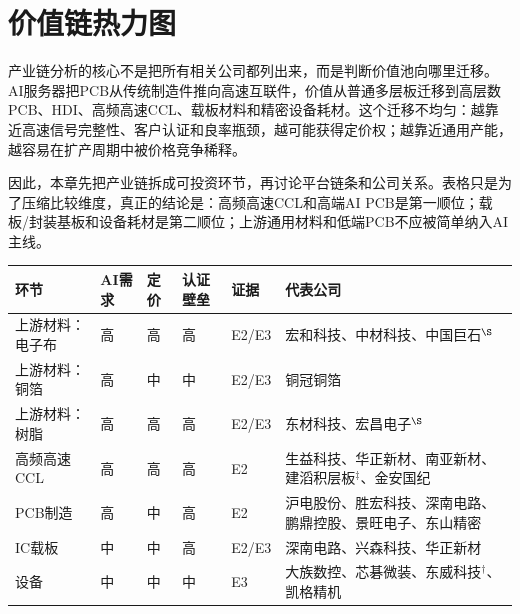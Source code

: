 \section{价值链热力图}

产业链分析的核心不是把所有相关公司都列出来，而是判断价值池向哪里迁移。AI服务器把PCB从传统制造件推向高速互联件，价值从普通多层板迁移到高层数PCB、HDI、高频高速CCL、载板材料和精密设备耗材。这个迁移不均匀：越靠近高速信号完整性、客户认证和良率瓶颈，越可能获得定价权；越靠近通用产能，越容易在扩产周期中被价格竞争稀释。

因此，本章先把产业链拆成可投资环节，再讨论平台链条和公司关系。表格只是为了压缩比较维度，真正的结论是：高频高速CCL和高端AI PCB是第一顺位；载板/封装基板和设备耗材是第二顺位；上游通用材料和低端PCB不应被简单纳入AI主线。

\begin{exhibitbox}[图表4-1：按瓶颈和可投资性划分的环节热力图]
\small
\begin{tabularx}{\textwidth}{L{2.4cm}C{1.8cm}C{1.8cm}C{1.8cm}C{1.8cm}X}
\toprule
\textbf{环节} & \textbf{AI需求} & \textbf{定价} & \textbf{认证壁垒} & \textbf{证据} & \textbf{代表公司} \\
\midrule
上游材料：电子布 & 高 & 高 & 高 & E2/E3 & 宏和科技、中材科技、中国巨石$^\S$ \\
上游材料：铜箔 & 高 & 中 & 中 & E2/E3 & 铜冠铜箔 \\
上游材料：树脂 & 高 & 高 & 高 & E2/E3 & 东材科技、宏昌电子$^\S$ \\
高频高速CCL & 高 & 高 & 高 & E2 & 生益科技、华正新材、南亚新材、建滔积层板$^\ddagger$、金安国纪 \\
PCB制造 & 高 & 中 & 高 & E2 & 沪电股份、胜宏科技、深南电路、鹏鼎控股、景旺电子、东山精密 \\
IC载板 & 中 & 中 & 高 & E2/E3 & 深南电路、兴森科技、华正新材 \\
设备 & 中 & 中 & 中 & E3 & 大族数控、芯碁微装、东威科技$^\dagger$、凯格精机 \\

\end{tabularx}
\end{exhibitbox}

